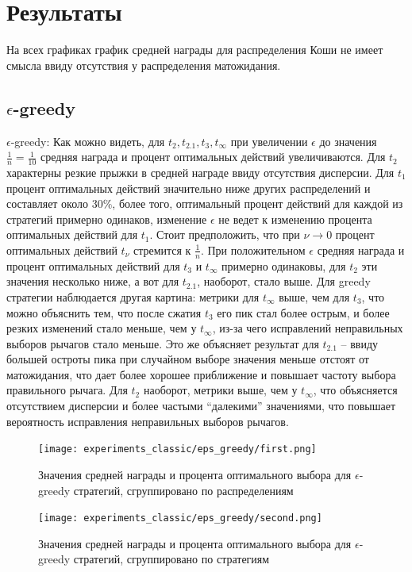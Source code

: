 \section{Результаты}

На всех графиках график средней награды для распределения Коши не имеет смысла ввиду отсутствия у распределения матожидания.

\subsection{$\epsilon$-greedy}
\label{subsec:classic_epsilon_greedy}

$\epsilon$-greedy: Как можно видеть, для $t_2, t_{2.1}, t_3, t_{\infty}$ при увеличении $\epsilon$ до значения $\frac{1}{n} = \frac{1}{10}$ средняя награда и процент оптимальных действий увеличиваются. Для $t_2$ характерны резкие прыжки в средней награде ввиду отсутствия дисперсии. Для $t_1$ процент оптимальных действий значительно ниже других распределений и составляет около $30\%$, более того, оптимальный процент действий для каждой из стратегий примерно одинаков, изменение $\epsilon$ не ведет к изменению процента оптимальных действий для $t_1$. Стоит предположить, что при $\nu \to 0$ процент оптимальных действий $t_{\nu}$ стремится к $\frac{1}{n}$. При положительном $\epsilon$ средняя награда и процент оптимальных действий для $t_3$ и $t_{\infty}$ примерно одинаковы, для $t_2$ эти значения несколько ниже, а вот для $t_{2.1}$, наоборот, стало выше. Для greedy стратегии наблюдается другая картина: метрики для $t_{\infty}$ выше, чем для $t_3$, что можно объяснить тем, что после сжатия $t_3$ его пик стал более острым, и более резких изменений стало меньше, чем у $t_{\infty}$, из-за чего исправлений неправильных выборов рычагов стало меньше. Это же объясняет результат для $t_{2.1}$ -- ввиду большей остроты пика при случайном выборе значения меньше отстоят от матожидания, что дает более хорошее приближение и повышает частоту выбора правильного рычага. Для $t_2$ наоборот, метрики выше, чем у $t_{\infty}$, что объясняется отсутствием дисперсии и более частыми ``далекими'' значениями, что повышает вероятность исправления неправильных выборов рычагов.
\begin{figure}[ht!]
    \centering
    \texttt{[image: experiments\_classic/eps\_greedy/first.png]}
    \caption{\label{fig:eps_greedy_1}Значения средней награды и процента оптимального выбора для $\epsilon$-greedy стратегий, сгруппировано по распределениям}
\end{figure}
\begin{figure}[ht!]
    \centering
    \texttt{[image: experiments\_classic/eps\_greedy/second.png]}
    \caption{\label{fig:eps_greedy_1}Значения средней награды и процента оптимального выбора для $\epsilon$-greedy стратегий, сгруппировано по стратегиям}
\end{figure}

